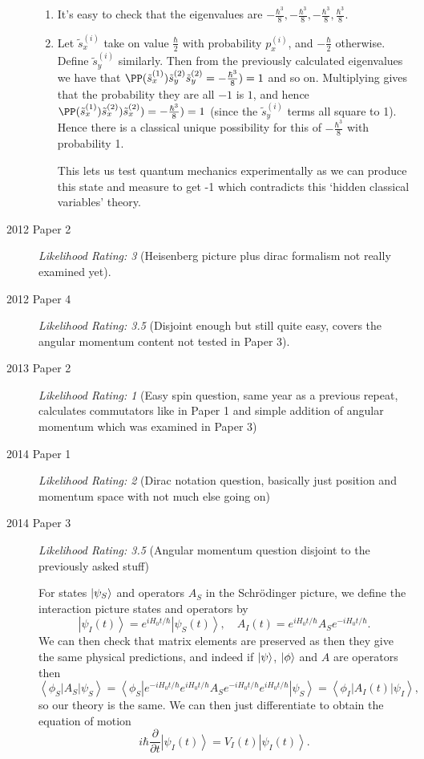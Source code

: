 \documentclass[a4paper]{scrartcl}
\begin{document}
\begin{description}
\begin{enumerate}[label=(\roman*)]
    \item It's easy to check that the eigenvalues are $-\frac{\hbar^3}{8}, -\frac{\hbar^3}{8}, -\frac{\hbar^3}{8}, \frac{\hbar^3}{8}$.
    \item Let $\tilde{s}_x^{(i)}$ take on value $\frac{\hbar}{2}$ with probability $p_{x}^{(i)}$, and $-\frac{\hbar}{2}$ otherwise. Define $\tilde{s}_y^{(i)}$ similarly. Then from the previously calculated eigenvalues we have that $\PP(\tilde{s}_x^{(1)})\tilde{s}_y^{(2)}\tilde{s}_y^{(2)} = -\frac{\hbar^3}{8}) = 1$ and so on. Multiplying gives that the probability they are all $-1$ is $1$, and hence $\PP(\tilde{s}_x^{(1)})\tilde{s}_x^{(2)})\tilde{s}_x^{(2)}) = -\frac{\hbar^3}{8}) = 1$ (since the $\tilde{s}_y^{(i)}$ terms all square to 1). Hence there is a classical unique possibility for this of $-\frac{\hbar^3}{8}$ with probability 1. 
    
    This lets us test quantum mechanics experimentally as we can produce this state and measure to get -1 which contradicts this `hidden classical variables' theory.
\end{enumerate}



    \item [2012 Paper 2] \emph{Likelihood Rating: 3} (Heisenberg picture plus dirac formalism not really examined yet).
    \item [2012 Paper 4] \emph{Likelihood Rating: 3.5} (Disjoint enough but still quite easy, covers the angular momentum content not tested in Paper 3).
    \item [2013 Paper 2] \emph{Likelihood Rating: 1} (Easy spin question, same year as a previous repeat, calculates commutators like in Paper 1 and simple addition of angular momentum which was examined in Paper 3)
    \item [2014 Paper 1] \emph{Likelihood Rating: 2} (Dirac notation question, basically just position and momentum space with not much else going on)
    \item [2014 Paper 3] \emph{Likelihood Rating: 3.5} (Angular momentum question disjoint to the previously asked stuff)

    For states $\ket{\psi_S}$ and operators $A_S$ in the Schr\"odinger picture, we define the interaction picture states and operators by
    $$
    \left|\psi_I(t)\right\rangle=e^{i H_0 t / \hbar}\left|\psi_S(t)\right\rangle, \quad A_I(t)=e^{i H_0 t / \hbar} A_S e^{-i H_0 t / \hbar}.
    $$
    We can then check that matrix elements are preserved as then they give the same physical predictions, and indeed if $\ket{\psi}$, $\ket{\phi}$ and $A$ are operators then
    $$
    \left\langle\phi_S\left|A_S\right| \psi_S\right\rangle=\left\langle\phi_S\left|e^{-i H_0 t / \hbar} e^{i H_0 t / \hbar} A_S e^{-i H_0 t / \hbar} e^{i H_0 t / \hbar}\right| \psi_S\right\rangle=\left\langle\phi_I\left|A_I(t)\right| \psi_I\right\rangle,
    $$
    so our theory is the same. We can then just differentiate to obtain the equation of motion 
    $$
    i \hbar \frac{\partial}{\partial t}\left|\psi_I(t)\right\rangle=V_I(t)\left|\psi_I(t)\right\rangle.
    $$
    

\end{description}
\end{document}
